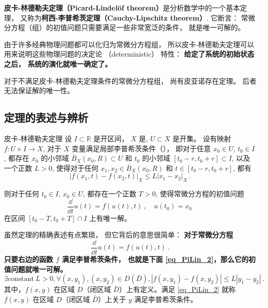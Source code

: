 
\textbf{皮卡-林德勒夫定理（Picard-Lindelöf theorem）}是分析数学中的一个基本定理， 又称为\textbf{柯西-李普希茨定理（Cauchy-Lipschitz theorem）}. 它断言： 常微分方程（组）的初值问题只需要满足一些非常宽泛的条件， 就是唯一可解的。 

由于许多经典物理问题都可以化归为常微分方程组， 所以皮卡-林德勒夫定理可以用来说明这些物理问题的决定论 （deterministic） 特性： \textbf{给定了系统的初始状态之后， 系统的演化就唯一确定了。}

对于不满足皮卡-林德勒夫定理条件的常微分方程组， 尚有皮亚诺存在定理。 后者无法保证解的唯一性。

\subsection{定理的表述与辨析}
\begin{theorem}{皮卡-林德勒夫定理}
设 $I\subset\mathbb{R}$ 是开区间， $X$ 是, $U\subset X$ 是开集。 设有映射 $f:U\times I\to X$, 对于 $X$ 变量满足局部李普希茨条件（）， 即对于任意 $x_0\in U$, $t_0\in I$, 都存在 $x_0$ 的小邻域 $\bar B_X(x_0,R)\subset U$ 和 $t_0$ 的小邻域 $[t_0-r,t_0+r]\subset I$, 以及一个正数 $L>0$, 使得对于任何 $x_1,x_2\in \bar B_X(x_0,R)$ 和 $t\in[t_0-r,t_0+r]$, 都有
$$
|f(x_1,t)-f(x_2,t)|_X\leq L|x_1-x_2|_X~.
$$

则对于任何 $t_0\in I$, $x_0\in U$, 都存在一个正数 $T>0$, 使得常微分方程的初值问题
$$
\frac{\dd}{\dd t}u(t)=f(u(t),t)~,\quad u(t_0)=x_0~
$$
在区间 $[t_0-T,t_0+T]\cap I$ 上有唯一解。
\end{theorem}

虽然定理的精确表述有点繁琐， 但它背后的意思很简单： \textbf{对于常微分方程}
\begin{equation}\label{eq_PiLin_1}
\frac{\dd}{\dd t}u(t)=f(u(t),t)~.
\end{equation}
\textbf{只要右边的函数 $f$ 满足李普希茨条件， 也就是下面 \autoref{eq_PiLin_2}，那么它的初值问题就唯一可解。} 
\begin{equation}\label{eq_PiLin_2}
\exists \text{constant}\ L > 0, \forall (x, y_1), (x, y_2) \in D(\bar{D}), \left|f(x, y_1)-f(x, y_2)\right| \le L \left|y_1 - y_2\right| ~.
\end{equation}
其中，$f(x, y)$ 在区域 $D$（闭区域 $\bar{D}$）上有定义。满足 \autoref{eq_PiLin_2} 就称 $f(x, y)$ 在区域 $D$（闭区域 $\bar{D}$）上关于 $y$ 满足李普希茨条件。

